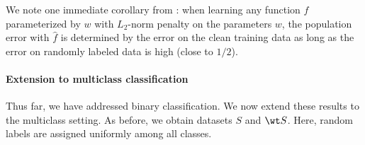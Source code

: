 

We note one immediate corollary 
from :
when learning any function $f$ parameterized by $w$ 
with $L_2$-norm penalty on the parameters $w$, 
the population error with $\widehat f$ is determined by the error on the clean training data as long as the error on randomly labeled data is high (close to $1/2$).  


\paragraph{Extension to multiclass classification} %
Thus far, we have addressed binary classification.
We now extend these results to the multiclass setting.
% 
As before, we obtain datasets 
$S$ and $\wt S$. 
Here, random labels are assigned
uniformly among all classes.
